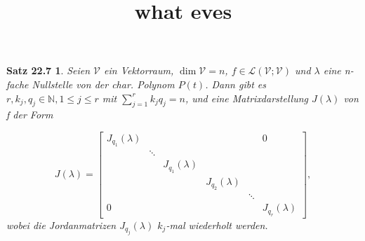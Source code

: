 \documentclass{article}
\title{what eves}
\newtheorem*{theorem}{Satz 22.7}
\newcommand{\LL}{\mathcal{L}}
\newcommand{\V}{\mathcal{V}}
\newcommand{\N}{\mathbb{N}}
\newcommand{\lam}{\lambda}
\begin{document}
\begin{theorem}
  Seien $\V$ ein Vektorraum, $\dim \V = n$, $ f \in \LL (\V;\V)$ und $\lambda$ eine n-fache
  Nullstelle von der char. Polynom $P(t)$. Dann gibt es $r,k_j,q_j \in \N,
  1 \le j \le r$ mit $\sum_{j=1}^{r}k_jq_j=n$, und eine Matrixdarstellung
  $J(\lambda)$ von f der Form

  \begin{equation*}
    J(\lam) = 
    \begin{bmatrix}
      J_{q_1}(\lambda) &         &                  &                  &        &  0 \\
                      & \ddots  &                  &                  &        & \\
                      &         & J_{q_1}(\lambda)  &                  &        & \\
                      &         &                  & J_{q_2}(\lambda)  &        & \\
                      &         &                  &                  & \ddots & \\
      0               &         &                  &                  &        & J_{q_r}(\lambda)
    \end{bmatrix},
  \end{equation*}
  wobei die Jordanmatrizen $J_{q_j}(\lam)$ $k_j$-mal wiederholt werden.
  
\end{theorem}
\end{document}

